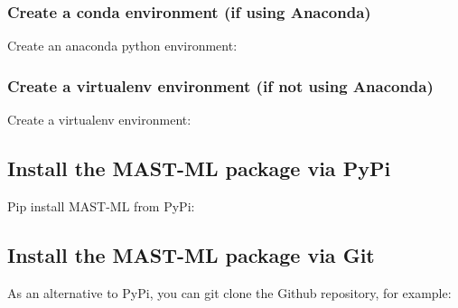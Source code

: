 \documentclass[letterpaper,10pt,english]{sphinxmanual}
\begin{document}
\subsubsection{Create a conda environment (if using Anaconda)}
\label{\detokenize{0_1_terminal_installation:create-a-conda-environment-if-using-anaconda}}
Create an anaconda python environment:

\begin{sphinxVerbatim}[commandchars=\\\{\}]
    
  
\end{sphinxVerbatim}


\subsubsection{Create a virtualenv environment (if not using Anaconda)}
\label{\detokenize{0_1_terminal_installation:create-a-virtualenv-environment-if-not-using-anaconda}}
Create a virtualenv environment:

\begin{sphinxVerbatim}[commandchars=\\\{\}]
   
 
\end{sphinxVerbatim}


\subsection{Install the MAST-ML package via PyPi}
\label{\detokenize{0_1_terminal_installation:install-the-mast-ml-package-via-pypi}}
Pip install MAST-ML from PyPi:

\begin{sphinxVerbatim}[commandchars=\\\{\}]
  
\end{sphinxVerbatim}


\subsection{Install the MAST-ML package via Git}
\label{\detokenize{0_1_terminal_installation:install-the-mast-ml-package-via-git}}
As an alternative to PyPi, you can git clone the Github repository, for example:
\end{document}
